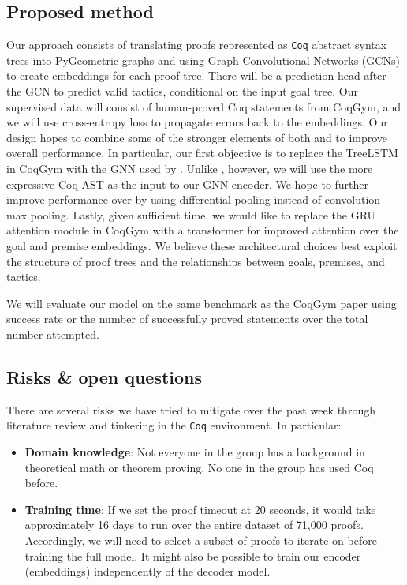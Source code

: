 \documentclass{article}
\begin{document}
\subsection{Proposed method}
Our approach consists of translating proofs represented as \texttt{Coq} abstract syntax trees into PyGeometric graphs and using Graph Convolutional Networks (GCNs) to create embeddings for each proof tree. There will be a prediction head after the GCN to predict valid tactics, conditional on the input goal tree. Our supervised data will consist of human-proved Coq statements from CoqGym, and we will use cross-entropy loss to propagate errors back to the embeddings. Our design hopes to combine some of the stronger elements of both \cite{hol} and \cite{coqgym} to improve overall performance. In particular, our first objective is to replace the TreeLSTM in CoqGym with the GNN used by \cite{hol}. Unlike \cite{hol}, however, we will use the more expressive Coq AST as the input to our GNN encoder. We hope to further improve performance over \cite{hol} by using differential pooling \cite{hier} instead of convolution-max pooling. Lastly, given sufficient time, we would like to replace the GRU attention module in CoqGym with a transformer for improved attention over the goal and premise embeddings. We believe these architectural choices best exploit the structure of proof trees and the relationships between goals, premises, and tactics.

We will evaluate our model on the same benchmark as the CoqGym paper \cite{coqgym} using success rate or the number of successfully proved statements over the total number attempted.

\subsection{Risks \& open questions}
There are several risks we have tried to mitigate over the past week through literature review and tinkering in the \texttt{Coq} environment. In particular:
\begin{itemize}
    \item \textbf{Domain knowledge}: Not everyone in the group has a background
      in theoretical math or theorem proving. No one in the group has used Coq
      before.
      
    \item \textbf{Training time}: If we set the proof timeout at 20 seconds, it would take approximately 16 days to run over the entire dataset of 71,000 proofs. Accordingly, we will need to select a subset of proofs to iterate on before training the full model. It might also be possible to train our encoder (embeddings) independently of the decoder model.
\end{itemize}


\printbibliography
\end{document}
